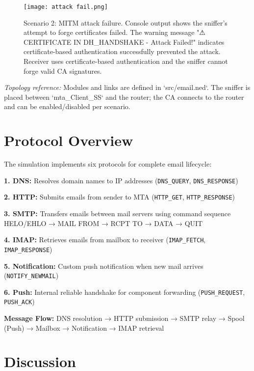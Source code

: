 \documentclass[a4paper,12pt]{extarticle}
\begin{document}
\vspace{0.5cm}

\begin{figure}[H]
    \centering
    \texttt{[image: attack fail.png]}
    \caption{Scenario 2: MITM attack failure. Console output shows the sniffer's attempt to forge certificates failed. The warning message "⚠ CERTIFICATE IN DH\_HANDSHAKE - Attack Failed!" indicates certificate-based authentication successfully prevented the attack. Receiver uses certificate-based authentication and the sniffer cannot forge valid CA signatures.}
    \label{fig:attack_fail}
\end{figure}

\vspace{0.2cm}
\noindent\textit{Topology reference:} Modules and links are defined in `src/email.ned`. The sniffer is placed between `mta\_Client\_SS` and the router; the CA connects to the router and can be enabled/disabled per scenario.


\section*{Protocol Overview}

The simulation implements six protocols for complete email lifecycle:

\textbf{1. DNS:} Resolves domain names to IP addresses (\texttt{DNS\_QUERY}, \texttt{DNS\_RESPONSE})

\textbf{2. HTTP:} Submits emails from sender to MTA (\texttt{HTTP\_GET}, \texttt{HTTP\_RESPONSE})

\textbf{3. SMTP:} Transfers emails between mail servers using command sequence HELO/EHLO → MAIL FROM → RCPT TO → DATA → QUIT

\textbf{4. IMAP:} Retrieves emails from mailbox to receiver (\texttt{IMAP\_FETCH}, \texttt{IMAP\_RESPONSE})

\textbf{5. Notification:} Custom push notification when new mail arrives (\texttt{NOTIFY\_NEWMAIL})

\textbf{6. Push:} Internal reliable handshake for component forwarding (\texttt{PUSH\_REQUEST}, \texttt{PUSH\_ACK})

\textbf{Message Flow:} DNS resolution → HTTP submission → SMTP relay → Spool (Push) → Mailbox → Notification → IMAP retrieval


\section*{Discussion}
\end{document}
